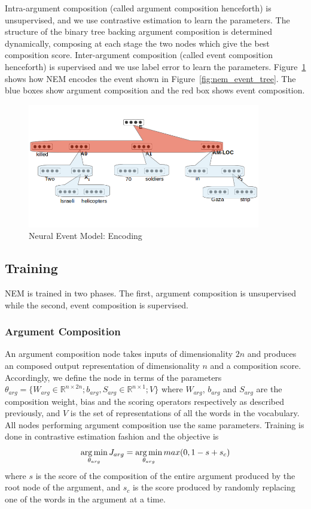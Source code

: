 Intra-argument composition 
(called argument composition henceforth) is unsupervised, and we use contrastive
estimation 
to learn the parameters.  The structure of the binary tree backing
argument composition is determined dynamically, composing at each stage the two
nodes
which give the best composition score.  Inter-argument 
composition (called event composition henceforth) is supervised
and we use label error to learn the parameters.  Figure~\ref{fig:nem}
shows how NEM encodes the event shown in Figure~\ref{fig:nem_event_tree}.  The blue
boxes show argument composition 
and the red box shows event composition.  
\begin{figure}
  \begin{center}
  \includegraphics[width=4in]{figures/nem2.png}
  \caption{Neural Event Model: Encoding}
  \label{fig:nem}
  \end{center}
\end{figure}

\subsection{Training}
NEM is trained in two phases.  The first, argument composition is unsupervised 
while the second, event composition is supervised.
\subsubsection{Argument Composition}
An argument composition node takes inputs of dimensionality $2n$ and produces an
composed output representation
of dimensionality $n$ and a composition score.  Accordingly, we define the node
in terms of the parameters $\theta_{arg} = \{W_{arg} \in \mathbb{R}^{n \times 2n}; b_{arg}, S_{arg} \in
\mathbb{R}^{n \times 1}; V\}$
where $W_{arg}$, $b_{arg}$ and $S_{arg}$ are the composition weight, bias and
the scoring operators respectively 
as described previously, and $V$ is the set of representations of all the words
in the vocabulary.  
All nodes performing argument composition use the same parameters.  Training is
done in contrastive estimation fashion
and the objective is 
\begin{equation*}
 \operatorname*{arg\,min}_{\theta_{arg}} J_{arg} = \operatorname*{arg\,min}_{\theta_{arg}} max(0, 1-s+s_c)
\end{equation*}
where $s$ is the score of the composition of the entire argument produced by 
the root node of the argument, and $s_c$ is the score produced by randomly
replacing one of the words in the argument at a time. 
